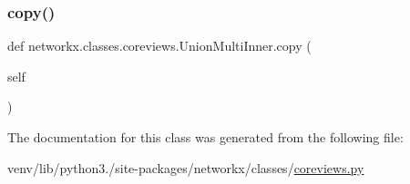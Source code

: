 \mbox{\label{classnetworkx_1_1classes_1_1coreviews_1_1UnionMultiInner_a0c0c03853f465e819bda4b334bfde19b}} 
\subsubsection{\texorpdfstring{copy()}{copy()}}
{\footnotesize\ttfamily def networkx.\+classes.\+coreviews.\+Union\+Multi\+Inner.\+copy (\begin{DoxyParamCaption}\item[{}]{self }\end{DoxyParamCaption})}



The documentation for this class was generated from the following file\+:\begin{DoxyCompactItemize}
\item 
venv/lib/python3./site-\/packages/networkx/classes/\hyperlink{coreviews_8py}{coreviews.\+py}\end{DoxyCompactItemize}
